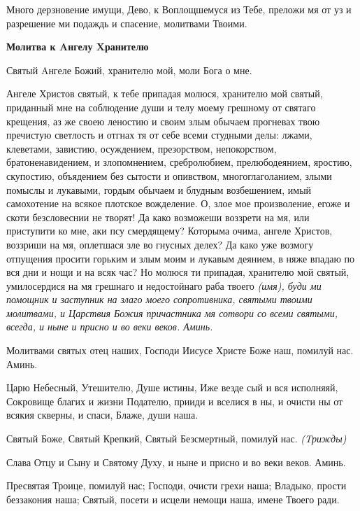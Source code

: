 Много дерзновение имущи, Дево, к Воплощшемуся из Тебе, преложи мя от уз и разрешение ми подаждь и спасение, молитвами Твоими.




\bfseries Молитва к Aнгелу Xранителю\normalfont{}


Святый Aнгеле Божий, хранителю мой, моли Бога о мне.


Ангеле Христов святый, к тебе припадая молюся, хранителю мой святый, приданный мне на соблюдение души и телу моему грешному от святаго крещения, аз же своею леностию и своим злым обычаем прогневах твою пречистую светлость и отгнах тя от себе всеми студными делы: лжами, клеветами, завистию, осуждением, презорством, непокорством, братоненавидением, и злопомнением, сребролюбием, прелюбодеянием, яростию, скупостию, объядением без сытости и опивством, многоглаголанием, злыми помыслы и лукавыми, гордым обычаем и блудным возбешением, имый самохотение на всякое плотское вожделение. О, злое мое произволение, егоже и скоти безсловеснии не творят! Да како возможеши воззрети на мя, или приступити ко мне, аки псу смердящему? Которыма очима, ангеле Христов, воззриши на мя, оплетшася зле во гнусных делех? Да како уже возмогу отпущения просити горьким и злым моим и лукавым деянием, в няже впадаю по вся дни и нощи и на всяк час? Но молюся ти припадая, хранителю мой святый, умилосердися на мя грешнаго и недостойнаго раба твоего \itshape (имя)\normalfont{}, буди ми помощник и заступник на злаго моего сопротивника, святыми твоими молитвами, и Царствия Божия причастника мя сотвори со всеми святыми, всегда, и ныне и присно и во веки веков. Аминь.


\mychapterending

 

Молитвами святых отец наших, Господи Иисусе Христе Боже наш, помилуй нас. Аминь.


Царю Небесный, Утешителю, Душе истины, Иже везде сый и вся исполняяй, Сокровище благих и жизни Подателю, прииди и вселися в ны, и очисти ны от всякия скверны, и спаси, Блаже, души наша.


Святый Боже, Святый Крепкий, Святый Безсмертный, помилуй нас. \itshape (Tрижды)\normalfont{}


Слава Отцу и Сыну и Святому Духу, и ныне и присно и во веки веков. Аминь.


Пресвятая Троице, помилуй нас; Господи, очисти грехи наша; Владыко, прости беззакония наша; Святый, посети и исцели немощи наша, имене Твоего ради.


